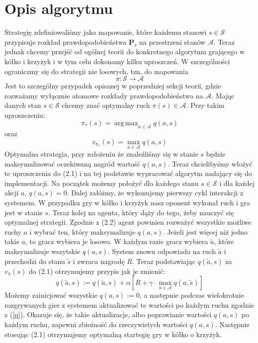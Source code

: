 \documentclass[licencjacka]{pracamgr}
\DeclareMathOperator*{\argmax}{arg\,max}
\begin{document}
\section{Opis algorytmu}
Strategię zdefiniowaliśmy jako mapowanie, które każdemu stanowi $s\in\mathcal{S}$ przypisuje rozkład prawdopodobieństwa $\mathbf{P}_{s}$ na przestrzeni stanów $\mathcal{A}$. Teraz jednak chcemy przejść od ogólnej teorii do konkretnego algorytmu grającego w kółko i krzyżyk i w tym celu dokonamy kilku uproszczeń. W szczególności ograniczmy się do strategii nie losowych, tzn, do mapowania
$$\pi : \mathcal{S}\rightarrow\mathcal{A}$$
Jest to szczególny przypadek opisanej w poprzedniej sekcji teorii, gdzie rozważamy wyłącznie atomowe rozkłady prawdopodobieństwa na $\mathcal{A}$. Mając danych stan $s\in\mathcal{S}$ chcemy znać optymalny ruch $\pi(s)\in\mathcal{A}$.  Przy takim uproszczeniu:
	$$\pi_{*}(s) = \argmax_{a\in\mathcal{A}} q(a,s)$$
		oraz
	$$v_{\pi_{*}}(s)=\max_{a\in\mathcal{A}} q(a,s)$$
Optymalna strategia, przy założeniu że znaleźliśmy się w stanie $s$ będzie maksymalizować oczekiwaną nagród wartość $q(a,s)$. Teraz chcielibyśmy włożyć te uproszczenia do (2.1) i na tej podstawie wypracować algorytm nadający się do implementacji. Na początek możemy położyć dla każdego stanu $s\in\mathcal{S}$ i dla każdej akcji $a$, $q(a,s) = 0$.  Dalej załóżmy, że wykonujemy pierwszy cykl interakcji  z systemem. W przypadku gry w kółko i krzyżyk nasz oponent wykonał ruch i gra jest w stanie $s$. Teraz kolej na agenta, który dąży do tego, żeby nauczyć się optymalnej strategii. Zgodnie z (2.2) agent powinien rozważyć wszystkie możliwe ruchy $a$ i wybrać ten, który maksymalizuje $q(a, s)$. Jeżeli jest więcej niż jedno takie $a$, to gracz wybiera je losowo. W każdym razie gracz wybiera  $\tilde{a}$, które maksymalizuje wszytskie $q(a,s)$. System znowu odpowiada na ruch $\tilde{a}$  i przechodzi do stanu $\tilde{s}$ i zwraca nagrodę $R$. Teraz podstawiając $q(\tilde{a},s)$ za $v_{\pi}(s)$ do (2.1) otrzymujemy przypis jak je  zmienić:\\
\begin{equation}
\label{q}
	q(\tilde{a},s) := q(\tilde{a},s) +\alpha[R + \gamma\cdot\max_{a\in\mathcal{A}}q(a,\tilde{s})]
\end{equation}
Możemy zainicjować wszystkie $q(a,s):=0$, a następnie podczas wielokrotnie rozgrywanych gier z systemem aktualizować te wartości po każdym ruchu zgodnie z (\ref{q}). Okazuje się, że takie aktualizacje, albo poprawianie wartości $q(a,s)$ po każdym ruchu, zapewni zbieżność do rzeczywistych wartości  $q(a,s)$. Następnie stosując (2.1) otrzymujemy optymalną startegię gry w kółko o krzyżyk.
\end{document}
